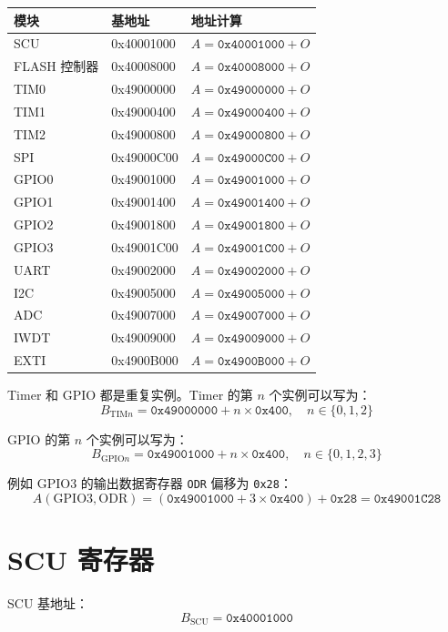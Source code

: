 \documentclass[UTF8,a4paper,11pt]{ctexart}
\newcommand{\addr}[1]{\texttt{#1}}
\newcommand{\reg}[1]{\texttt{#1}}
\begin{document}
\begin{longtable}{p{2.3cm}>{\ttfamily}p{3.2cm}p{7.7cm}}
\toprule
模块 & 基地址 & 地址计算 \\
\midrule
\endhead
SCU & 0x40001000 & $A = \addr{0x40001000} + O$ \\
FLASH 控制器 & 0x40008000 & $A = \addr{0x40008000} + O$ \\
TIM0 & 0x49000000 & $A = \addr{0x49000000} + O$ \\
TIM1 & 0x49000400 & $A = \addr{0x49000400} + O$ \\
TIM2 & 0x49000800 & $A = \addr{0x49000800} + O$ \\
SPI & 0x49000C00 & $A = \addr{0x49000C00} + O$ \\
GPIO0 & 0x49001000 & $A = \addr{0x49001000} + O$ \\
GPIO1 & 0x49001400 & $A = \addr{0x49001400} + O$ \\
GPIO2 & 0x49001800 & $A = \addr{0x49001800} + O$ \\
GPIO3 & 0x49001C00 & $A = \addr{0x49001C00} + O$ \\
UART & 0x49002000 & $A = \addr{0x49002000} + O$ \\
I2C & 0x49005000 & $A = \addr{0x49005000} + O$ \\
ADC & 0x49007000 & $A = \addr{0x49007000} + O$ \\
IWDT & 0x49009000 & $A = \addr{0x49009000} + O$ \\
EXTI & 0x4900B000 & $A = \addr{0x4900B000} + O$ \\
\bottomrule
\end{longtable}

Timer 和 GPIO 都是重复实例。Timer 的第 $n$ 个实例可以写为：
\[
  B_{\mathrm{TIM}n} = \addr{0x49000000} + n \times \addr{0x400},
  \quad n \in \{0,1,2\}
\]

GPIO 的第 $n$ 个实例可以写为：
\[
  B_{\mathrm{GPIO}n} = \addr{0x49001000} + n \times \addr{0x400},
  \quad n \in \{0,1,2,3\}
\]

例如 GPIO3 的输出数据寄存器 \reg{ODR} 偏移为 \addr{0x28}：
\[
  A(\mathrm{GPIO3},\mathrm{ODR})
  =
  \left(\addr{0x49001000} + 3 \times \addr{0x400}\right)
  + \addr{0x28}
  =
  \addr{0x49001C28}
\]

\section{SCU 寄存器}

SCU 基地址：
\[
  B_{\mathrm{SCU}} = \addr{0x40001000}
\]
\end{document}
